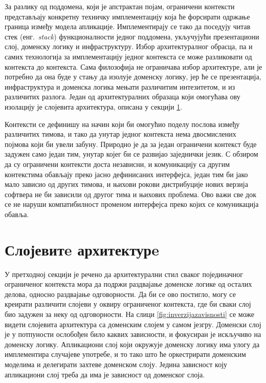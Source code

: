 \documentclass[12pt,oneside]{memoir}
\begin{document}
За разлику од поддомена, који је апстрактан појам, ограничени контексти представљају конкретну техничку имплементацију која ће форсирати одржање граница између модела апликације. Имплементирају се тако да поседују читав стек (енг.~\textit{stack}) функционалности једног поддомена, укључујући презентациони слој, доменску логику и инфраструктуру. Избор архитектуралног обрасца, па и самих технологија за имплементацију једног контекста се може разликовати од контекста до контекста. Сама филозофија не ограничава избор архитектуре, али је потребно да она буде у стању да изолује доменску логику, јер ће се презентација, инфраструктура и доменска логика мењати различитим интезитетом, и из различитих разлога. Један од архитектуралних образаца који омогућава ову изолацију је слојевита архитектура, описана у секцији \ref{sectionslojevitaarhitektura}.

Контексти се дефинишу на начин који би омогућио поделу послова између различитих тимова, и тако да унутар једног контекста нема двосмислених појмова који би увели забуну. Природно је да за један ограничени контекст буде задужен само један тим, унутар којег би се развијао заједнички језик. С обзиром да су ограничени контексти доста независни, и комуникацију са другим контекстима обављају преко јасно дефинисаних интерфејса, један тим би јако мало зависио од других тимова, и њихови рокови дистрибуције нових верзија софтвера не би зависили од другог тима и њихових проблема. Ово важи све док се не наруши компатибилност променом интерфејса преко којих се комуникација обавља.

\section{Слојевитe архитектурe}\label{sectionslojevitaarhitektura}
У претходној секцији је речено да архитектурални стил сваког појединачног ограниченог контекста мора да подржи раздвајање доменске логике од осталих делова, односно раздвајање одговорности. Да би се ово постигло, могу се креирати различити слојеви у оквиру ограниченог контекста, где би сваки слој био задужен за неку од одговорности. На слици \ref{fig:inverzijazavisnosti} се може видети слојевита архитектура са доменским слојем у самом језгру. Доменски слој је у потпуности ослобођен било каквих зависности, и фокусиран је искључиво на доменску логику. Апликациони слој који окружује доменску логику има улогу да имплементира случајеве употребе, и то тако што ће оркестрирати доменским моделима и делегирати захтеве доменском слоју. Једина зависност коју апликациони слој треба да има је зависност од доменског слоја.
\end{document}
